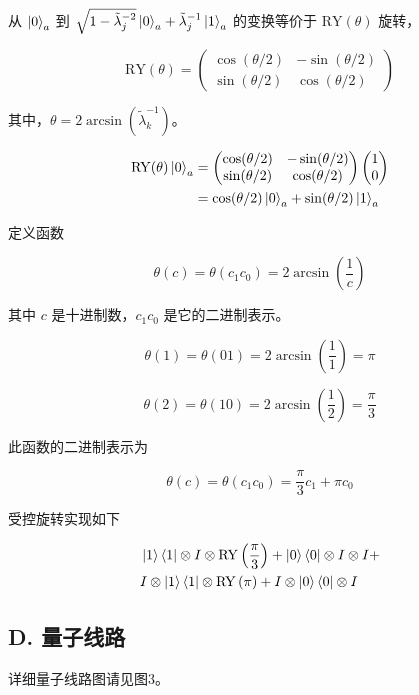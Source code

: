 \documentclass[aps,prl,twocolumn,groupedaddress]{revtex4-2}
\begin{document}
从 $\ket{0}_a$ 到 $\sqrt{1-\tilde{\lambda}_j^{-2}}\ket{0}_a+\tilde{\lambda}_j^{-1}\ket{1}_a$ 的变换等价于 $\mathrm{RY}(\theta)$ 旋转，

$$
\mathrm{RY}(\theta)
=\begin{pmatrix}
\cos(\theta/2) &-\sin(\theta/2) \\
\sin(\theta/2) &\cos(\theta/2)
\end{pmatrix}
$$

其中，$\theta=2\arcsin\left(\tilde{\lambda}_k^{-1}\right)$。

$$
\begin{aligned}
\mathrm{RY}(\theta)\ket{0}_a
&=\begin{pmatrix}
\cos(\theta/2) &-\sin(\theta/2) \\
\sin(\theta/2) &\cos(\theta/2)
\end{pmatrix}
\begin{pmatrix}
1 \\
0
\end{pmatrix} \\
&=\cos(\theta/2)\ket{0}_a + \sin(\theta/2)\ket{1}_a
\end{aligned}
$$

定义函数

$$
\theta(c) = \theta(c_1c_0) = 2\arcsin\left(\frac{1 }{c }  \right)
$$

其中 $c$ 是十进制数，$c_1c_0$ 是它的二进制表示。

$$
\theta(1) = \theta(01) = 2\arcsin\left(\frac{1 }{1 }  \right) = \pi
$$

$$
\theta(2) = \theta(10) = 2\arcsin\left(\frac{1 }{2 }  \right) = \frac{\pi }{3 } 
$$

此函数的二进制表示为

$$
\theta(c) = \theta(c_1c_0) = \frac{\pi }{3 }c_1 + \pi c_0 
$$

受控旋转实现如下

$$
\begin{aligned}
&\ket{1}\bra{1}\otimes I \otimes \mathrm{RY}\left(\frac{\pi }{3 }  \right) + \ket{0}\bra{0}\otimes I\otimes I + \\ 
&I\otimes\ket{1}\bra{1}\otimes \mathrm{RY}\left(\pi \right) + I\otimes\ket{0}\bra{0}\otimes I
\end{aligned}
$$

\subsection{D. 量子线路}

详细量子线路图请见图3。
\end{document}
